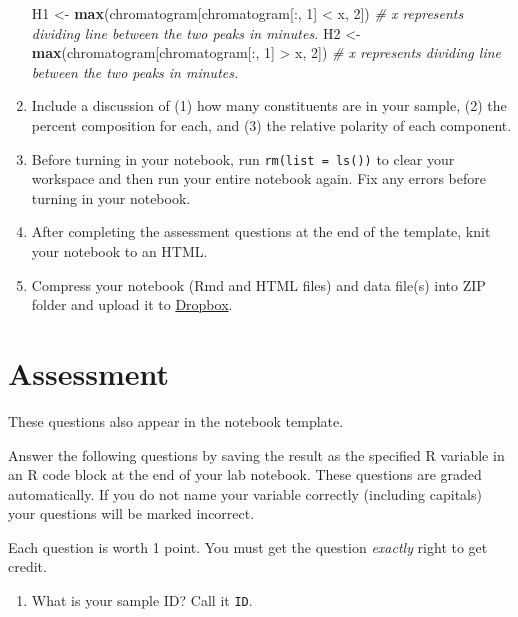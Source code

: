 \documentclass[]{tufte-book}
\newenvironment{Shaded}{}{}
\newcommand{\CommentTok}[1]{\textcolor[rgb]{0.38,0.63,0.69}{\textit{#1}}}
\newcommand{\DecValTok}[1]{\textcolor[rgb]{0.25,0.63,0.44}{#1}}
\newcommand{\KeywordTok}[1]{\textcolor[rgb]{0.00,0.44,0.13}{\textbf{#1}}}
\newcommand{\NormalTok}[1]{#1}
\newcommand{\OperatorTok}[1]{\textcolor[rgb]{0.40,0.40,0.40}{#1}}
\newcommand{\StringTok}[1]{\textcolor[rgb]{0.25,0.44,0.63}{#1}}
\providecommand{\tightlist}{%
  \setlength{\itemsep}{0pt}\setlength{\parskip}{0pt}}
\begin{document}
\begin{enumerate}
\begin{Shaded}
\begin{Highlighting}[]
\NormalTok{H1 <-}\StringTok{ }\KeywordTok{max}\NormalTok{(chromatogram[chromatogram[}\OperatorTok{:}\NormalTok{, }\DecValTok{1}\NormalTok{] }\OperatorTok{<}\StringTok{ }\NormalTok{x, }\DecValTok{2}\NormalTok{]) }\CommentTok{# x represents dividing line between the two peaks in minutes.}
\NormalTok{H2 <-}\StringTok{ }\KeywordTok{max}\NormalTok{(chromatogram[chromatogram[}\OperatorTok{:}\NormalTok{, }\DecValTok{1}\NormalTok{] }\OperatorTok{>}\StringTok{ }\NormalTok{x, }\DecValTok{2}\NormalTok{]) }\CommentTok{# x represents dividing line between the two peaks in minutes.}
\end{Highlighting}
\end{Shaded}
\item
  Include a discussion of (1) how many constituents are in your sample, (2) the percent composition for each, and (3) the relative polarity of each component.
\item
  Before turning in your notebook, run \texttt{rm(list\ =\ ls())} to clear your workspace and then run your entire notebook again. Fix any errors before turning in your notebook.
\item
  After completing the assessment questions at the end of the template, knit your notebook to an HTML.
\item
  Compress your notebook (Rmd and HTML files) and data file(s) into ZIP folder and upload it to \href{https://alphonse.github.io/chem370/assignments/submissions.html}{Dropbox}.
\end{enumerate}

\hypertarget{gctcd-assessment}{%
\section{Assessment}\label{gctcd-assessment}}

These questions also appear in the notebook template.

Answer the following questions by saving the result as the specified R variable in an R code block at the end of your lab notebook. These questions are graded automatically. If you do not name your variable correctly (including capitals) your questions will be marked incorrect.

Each question is worth 1 point. You must get the question \emph{exactly} right to get credit.

\begin{enumerate}
\def\labelenumi{\arabic{enumi}.}
\tightlist
\item
  What is your sample ID? Call it \texttt{ID}.
\end{enumerate}
\end{document}
